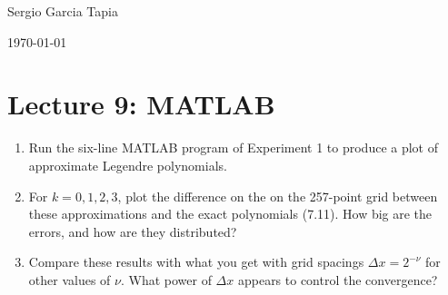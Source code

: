 \documentclass[12pt]{article}
\newenvironment{ex}[2][Exercise]{\begin{trivlist}
		\item[\hskip \labelsep {\bfseries #1}\hskip \labelsep {\bfseries #2.}]}{\end{trivlist}}
\begin{document}

\noindent Sergio Garcia Tapia \hfill

 \hfill 

 \hfill 

\noindent\today
\section*{Lecture 9: MATLAB}

\begin{ex}{1}
	\begin{enumerate}[label=(\alph*)]
		\item Run the six-line MATLAB program of Experiment 1 to produce a plot of approximate
		Legendre polynomials.
		\item For $k = 0,1,2,3$, plot the difference on the on the 257-point grid between these
		approximations and the exact polynomials (7.11). How big are the errors, and how are they
		distributed?
		\item Compare these results with what you get with grid spacings $\Delta x = 2^{-\nu}$ for
		other values of $\nu$. What power of $\Delta x$ appears to control the convergence?
	\end{enumerate}
\end{ex}
\end{document}
